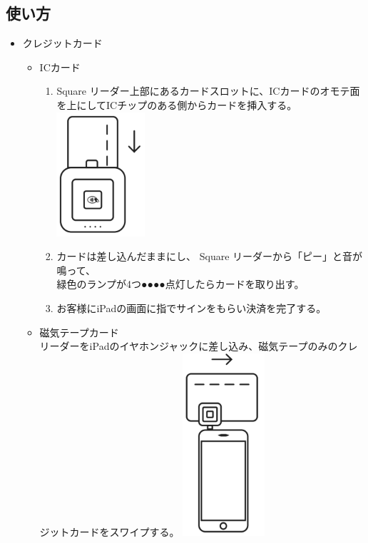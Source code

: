 \documentclass[dvipdfmx,jb5]{jreport}
\begin{document}
\subsection{使い方}
\begin{itemize}
      \item クレジットカード
            \begin{itemize}
                  \item ICカード
                        \begin{enumerate}[手順1]
                              \item Square リーダー上部にあるカードスロットに、ICカードのオモテ面を上にしてICチップのある側からカードを挿入する。\\
                                    \includegraphics[scale=0.4]{assets/square_insert-card.png}
                              \item カードは差し込んだままにし、 Square リーダーから「ピー」と音が鳴って、\\緑色のランプが4つ{\color{green}●●●●}点灯したらカードを取り出す。
                              \item お客様にiPadの画面に指でサインをもらい決済を完了する。
                        \end{enumerate}
                  \item 磁気テープカード\\
                        リーダーをiPadのイヤホンジャックに差し込み、磁気テープのみのクレジットカードをスワイプする。
                        \includegraphics[scale=0.4]{assets/square_slide-card.png}

\end{itemize}
\end{itemize}
\end{document}
